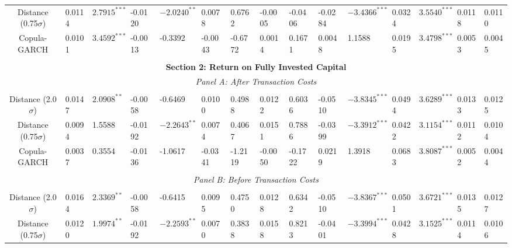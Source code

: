 \documentclass[a4paper]{article}
\begin{document}
\begin{sidewaystable}
\begin{threeparttable}[H]
\begin{tabularx}{\textwidth}{@{\extracolsep{\fill}}lllllllllllllll@{}}
			\multicolumn{1}{c}{Distance (0.75$\sigma$)} & 0.0114 & $2.7915^{***}$ & -0.0120 & $-2.0240^{**}$ & 0.0078 & 0.6762 & -0.0005 & -0.0406 & -0.0284 & $-3.4366^{***}$ & 0.0324 & $3.5540^{***}$ & 0.0118 & 0.0110 \\
			\multicolumn{1}{c}{Copula-GARCH} & 0.0101 & $3.4592^{***}$ & -0.0013 & -0.3392 & -0.0043 & -0.6772 & 0.0014 & 0.1671 & 0.0048 & 1.1588 & 0.0195 & $3.4798^{***}$ & 0.0053 & 0.0045 \\
			&       &       &       &       &       &       &       &       &       &       &       &       &       &  \\
			\midrule
			\multicolumn{15}{c}{\textbf{Section 2: Return on Fully Invested Capital}} \\
			\multicolumn{15}{c}{\textit{Panel A: After Transaction Costs}} \\
			&       &       &       &       &       &       &       &       &       &       &       &       &       &  \\
			\multicolumn{1}{c}{Distance (2.0$\sigma$)} & 0.0147 & $2.0908^{**}$ & -0.0058 & -0.6469 & 0.0100 & 0.4988 & 0.0122 & 0.6036 & -0.0510 & $-3.8345^{***}$ & 0.0494 & $3.6289^{***}$ & 0.0133 & 0.0125 \\
			\multicolumn{1}{c}{Distance (0.75$\sigma$)} & 0.0094 & 1.5588 & -0.0192 & $-2.2643^{**}$ & 0.0074 & 0.4067 & 0.0151 & 0.7886 & -0.0399 & $-3.3912^{***}$ & 0.0422 & $3.1154^{***}$ & 0.0112 & 0.0104 \\
			\multicolumn{1}{c}{Copula-GARCH} & 0.0037 & 0.3554 & -0.0136 & -1.0617 & -0.0341 & -1.2119 & -0.0050 & -0.1722 & 0.0219 & 1.3918 & 0.0683 & $3.8087^{***}$ & 0.0052 & 0.0044 \\
			&       &       &       &       &       &       &       &       &       &       &       &       &       &  \\
			\multicolumn{15}{c}{\textit{Panel B: Before Transaction Costs}} \\
			&       &       &       &       &       &       &       &       &       &       &       &       &       &  \\
			\multicolumn{1}{c}{Distance (2.0$\sigma$)} & 0.0164 & $2.3369^{**}$ & -0.0058 & -0.6415 & 0.0095 & 0.4750 & 0.0128 & 0.6342 & -0.0510 & $-3.8367^{***}$ & 0.0501 & $3.6721^{***}$ & 0.0135 & 0.0127 \\
			\multicolumn{1}{c}{Distance (0.75$\sigma$)} & 0.0120 & $1.9974^{**}$ & -0.0192 & $-2.2593^{**}$ & 0.0070 & 0.3838 & 0.0158 & 0.8213 & -0.0401 & $-3.3994^{***}$ & 0.0428 & $3.1525^{***}$ & 0.0114 & 0.0106 \\

\end{tabularx}
\end{threeparttable}
\end{sidewaystable}
\end{document}
